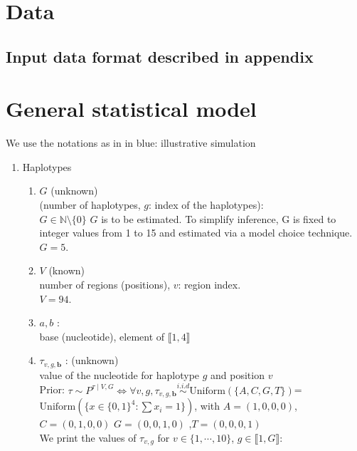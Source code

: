 \documentclass{article}
\newcommand\indexvec[1]{\mathbf{#1}}
\begin{document}
\section{Data}

\subsection{Input data format described in appendix}


\section{General statistical model}
We use the notations as in \cite{quince2017desman}
in blue: illustrative simulation
\begin{enumerate}
\item Haplotypes
\begin{enumerate}
    \item $G$ (unknown)\\ 
     (number of haplotypes, $g$: index of the haplotypes):\\
     $G\in \mathbb{N}\setminus\{0\}$ $G$ is to be estimated. To simplify inference, G is fixed to integer values from 1 to 15 and estimated via a model choice technique.\\
    {\color{blue}$G = 5$}.
    \item $V$ (known)\\
     number of regions (positions), $v$: region index.\\
    {\color{blue}$V = 94$}.
        \item $a,b$ :\\
         base (nucleotide), element of $\llbracket 1,4 \rrbracket$
    \item $\tau_{v,g,\indexvec{b}}$ : (unknown)\\
    value of the nucleotide for haplotype $g$ and position $v$\\
Prior: $\tau\sim P^{\tau\mid V,G}\Leftrightarrow \forall v,g, \tau_{v,g,\indexvec{b}}\overset{i.i.d}{\sim}\mathrm{Uniform}(\{A,C,G,T\})$=$\mathrm{Uniform}(\{x\in\{0,1\}^4:\sum x_i=1\})$, with $A=(1,0,0,0)$, $C=(0,1,0,0)$ $G=(0,0,1,0)$ ,$T=(0,0,0,1)$ \\
{\color{blue} We print the values of $\tau_{v,g}$ for $v\in \{1,\cdots,10\}$, $g\in\llbracket 1,G \rrbracket$:\\
 
}
\end{enumerate}
\end{enumerate}
\end{document}
